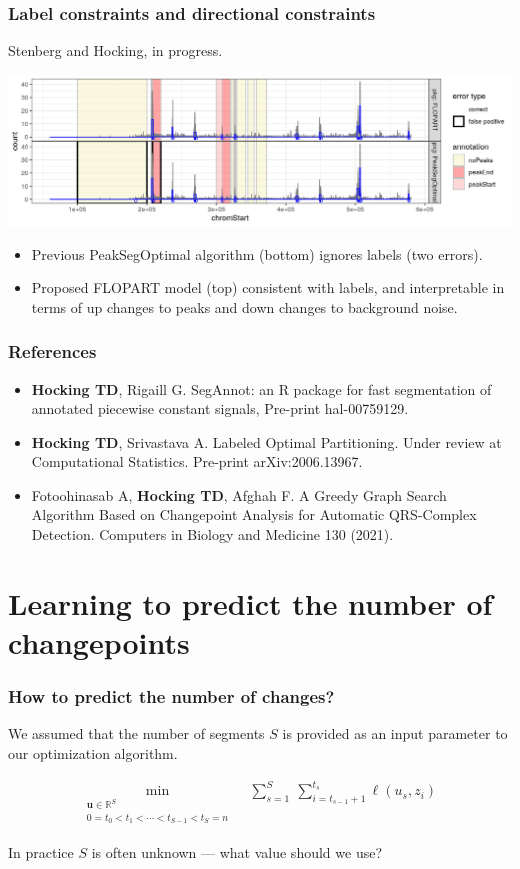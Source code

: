 \documentclass{beamer}
\newcommand{\RR}{\mathbb R}
\begin{document}
\begin{frame}
  \frametitle{Label constraints and directional constraints}
  Stenberg and Hocking, in progress.

  \includegraphics[width=\linewidth]{FLOPART-example}

  \begin{itemize}
  \item Previous PeakSegOptimal algorithm (bottom) ignores labels (two
    errors).
  \item Proposed FLOPART model (top) consistent with labels, and
    interpretable in terms of up changes to peaks and down changes to
    background noise.
  \end{itemize}
\end{frame}

\begin{frame}
  \frametitle{References}
  \scriptsize
  \begin{itemize}
  \item \textbf{Hocking TD}, Rigaill G. SegAnnot: an R package for
    fast segmentation of annotated piecewise constant signals,
    Pre-print hal-00759129.
  \item \textbf{Hocking TD}, Srivastava A. Labeled Optimal
    Partitioning. Under review at Computational Statistics. Pre-print
    arXiv:2006.13967.
  \item Fotoohinasab A, \textbf{Hocking TD}, Afghah F. A Greedy Graph
    Search Algorithm Based on Changepoint Analysis for Automatic
    QRS-Complex Detection. Computers in Biology and Medicine 130
    (2021).
  \end{itemize}
\end{frame}

\section{Learning to predict the number of changepoints}

\begin{frame}
  \frametitle{How to predict the number of changes?}

  We assumed that the number of segments $S$ is provided as an input
  parameter to our optimization algorithm.

\begin{align*}
\min_{\substack{
  \mathbf u\in\RR^{S}
\\
   0=t_0<t_1<\cdots<t_{S-1}<t_S=n
}} & \ \
    \sum_{s=1}^S\  \sum_{i=t_{s-1}+1}^{t_s} \ell( u_s,  z_i) 
  \nonumber
\end{align*}

In practice $S$ is often unknown --- what value should we use?

\end{frame}
\end{document}
